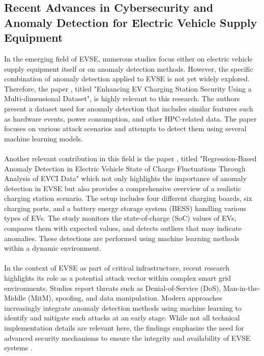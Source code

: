 \subsection{Recent Advances in Cybersecurity and Anomaly Detection for Electric Vehicle Supply Equipment}

In the emerging field of EVSE, numerous studies focus either on electric vehicle supply equipment itself or on anomaly detection methods. However, the specific combination of anomaly detection applied to EVSE is not yet widely explored. Therefore, the paper \cite{EV_Security}, titled "Enhancing EV Charging Station Security Using a Multi-dimensional Dataset", is highly relevant to this research. The authors present a dataset used for anomaly detection that includes similar features such as hardware events, power consumption, and other HPC-related data. The paper focuses on various attack scenarios and attempts to detect them using several machine learning models.\\
\\
Another relevant contribution in this field is the paper \cite{paper_relevance_EVSE}, titled "Regression-Based Anomaly Detection in Electric Vehicle State of Charge Fluctuations Through Analysis of EVCI Data" which not only highlights the importance of anomaly detection in EVSE but also provides a comprehensive overview of a realistic charging station scenario. The setup includes four different charging boards, six charging ports, and a battery energy storage system (BESS) handling various types of EVs. The study monitors the state-of-charge (SoC) values of EVs, compares them with expected values, and detects outliers that may indicate anomalies. These detections are performed using machine learning methods within a dynamic environment.\\
\\
In the context of EVSE as part of critical infrastructure, recent research highlights its role as a potential attack vector within complex smart grid environments. Studies report threats such as Denial-of-Service (DoS), Man-in-the-Middle (MitM), spoofing, and data manipulation. Modern approaches increasingly integrate anomaly detection methods using machine learning to identify and mitigate such attacks at an early stage. While not all technical implementation details are relevant here, the findings emphasize the need for advanced security mechanisms to ensure the integrity and availability of EVSE systems \cite{nature2025}.
